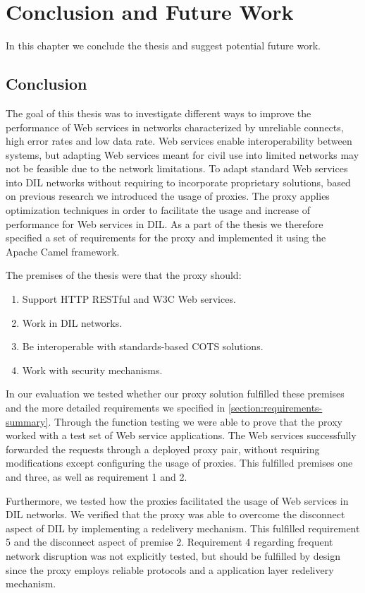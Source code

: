 \chapter{Conclusion and Future Work}
\label{chapter:conclusion}

In this chapter we conclude the thesis and suggest potential future work.

\section{Conclusion}

The goal of this thesis was to investigate different ways to improve the
performance of Web services in networks characterized by unreliable connects,
high error rates and low data rate. Web services enable interoperability between
systems, but adapting Web services meant for civil use into limited networks may
not be feasible due to the network limitations. To adapt standard Web services
into DIL networks without requiring to incorporate proprietary solutions, based
on previous research we introduced the usage of proxies. The proxy applies
optimization techniques in order to facilitate the usage and increase of
performance for Web services in DIL. As a part of the thesis we therefore
specified a set of requirements for the proxy and implemented it using the
Apache Camel framework.

The premises of the thesis were that the proxy should:

\begin{enumerate}
    \item Support HTTP RESTful and W3C Web services.
    \item Work in DIL networks.
    \item Be interoperable with standards-based COTS solutions.
    \item Work with security mechanisms.
\end{enumerate}

In our evaluation we tested whether our proxy solution fulfilled these premises
and the more detailed requirements we specified in
\cref{section:requirements-summary}. Through the function testing we were able
to prove that the proxy worked with a test set of Web service applications. The
Web services successfully forwarded the requests through a deployed proxy pair,
without requiring modifications except configuring the usage of proxies. This
fulfilled premises one and three, as well as requirement 1 and 2.

Furthermore, we tested how the proxies facilitated the usage of Web services in
DIL networks. We verified that the proxy was able to overcome the disconnect
aspect of DIL by implementing a redelivery mechanism. This fulfilled requirement
5 and the disconnect aspect of premise 2. Requirement 4 regarding frequent
network disruption was not explicitly tested, but should be fulfilled by design
since the proxy employs reliable protocols and a application layer redelivery
mechanism.

